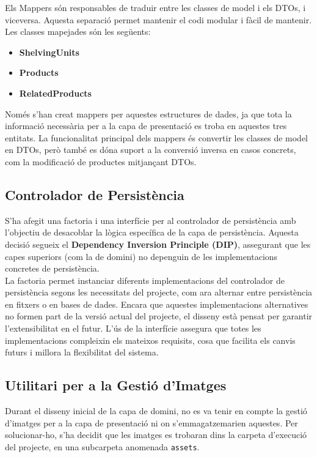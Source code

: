 \documentclass[a4paper,12pt]{report}
\begin{document}
Els Mappers són responsables de traduir entre les classes de model i els DTOs, i viceversa. Aquesta separació permet mantenir el codi modular i fàcil de mantenir. Les classes mapejades són les següents:
\begin{itemize}
	\item \textbf{ShelvingUnits}
	\item \textbf{Products}
	\item \textbf{RelatedProducts}
\end{itemize}
Només s'han creat mappers per aquestes estructures de dades, ja que tota la informació necessària per a la capa de presentació es troba en aquestes tres entitats. La funcionalitat principal dels mappers és convertir les classes de model en DTOs, però també es dóna suport a la conversió inversa en casos concrets, com la modificació de productes mitjançant DTOs.

\subsection{Controlador de Persistència}
S'ha afegit una factoria i una interfície per al controlador de persistència amb l'objectiu de desacoblar la lògica específica de la capa de persistència. Aquesta decisió segueix el \textbf{Dependency Inversion Principle (DIP)}, assegurant que les capes superiors (com la de domini) no depenguin de les implementacions concretes de persistència.\\

La factoria permet instanciar diferents implementacions del controlador de persistència segons les necessitats del projecte, com ara alternar entre persistència en fitxers o en bases de dades. Encara que aquestes implementacions alternatives no formen part de la versió actual del projecte, el disseny està pensat per garantir l'extensibilitat en el futur. L'ús de la interfície assegura que totes les implementacions compleixin els mateixos requisits, cosa que facilita els canvis futurs i millora la flexibilitat del sistema.
\subsection{Utilitari per a la Gestió d'Imatges}
Durant el disseny inicial de la capa de domini, no es va tenir en compte la gestió d'imatges per a la capa de presentació ni on s'emmagatzemarien aquestes. Per solucionar-ho, s'ha decidit que les imatges es trobaran dins la carpeta d'execució del projecte, en una subcarpeta anomenada \texttt{assets}. \\
\end{document}
